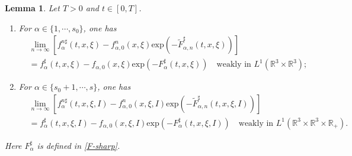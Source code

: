 \documentclass[reqno,11pt]{amsart}
\newtheorem{lemma}{Lemma}[section]
\numberwithin{equation}{section}
\def\R{\mathbb{R}}
\def\exp{\mathrm{exp}}
\begin{document}
\begin{lemma}\label{Lemma 7.1}
	Let $T>0$ and $t\in [0,T]$.
		\begin{enumerate}
		\item {For $\alpha \in \{1,\cdots,s_0\}$, one has
	\begin{equation}\label{eq7.88}
		\begin{aligned}
			& \lim \limits_{n\rightarrow \infty} [ f^{n\sharp}_\alpha (t,x,\xi) -f^n_{\alpha ,0} (x,\xi )\exp(-\tilde{F}^\sharp _{\alpha ,n } (t,x,\xi )) ] \\
			&= f^{\sharp}_\alpha (t,x,\xi) -f_{\alpha ,0} (x,\xi )\exp(-F^\sharp _{\alpha } (t,x,\xi )) \quad \text{weakly in } L^1 (\R^3 \times \R^3);
		\end{aligned}
	\end{equation}}
	\item {For $\alpha \in \{s_0+1,\cdots,s\}$, one has
	\begin{equation}\label{eq7.89}
		\begin{aligned}
			& \lim \limits_{n\rightarrow \infty} [ f^{n\sharp}_\alpha (t,x,\xi ,I) -f^n_{\alpha ,0} (x,\xi ,I )\exp(-\tilde{F}^\sharp _{\alpha ,n } (t,x,\xi ,I)) ] \\
			&= f^{\sharp}_\alpha (t,x,\xi ,I) -f_{\alpha ,0} (x,\xi ,I )\exp(- F^\sharp_{\alpha } (t,x,\xi ,I)) \quad \text{weakly in } L^1 (\R^3 \times \R^3 \times \R_+).
		\end{aligned}
	\end{equation}}
\end{enumerate}
Here $F^\sharp_{\alpha }$ is defined in \eqref{F-sharp}.
\end{lemma}
\end{document}
